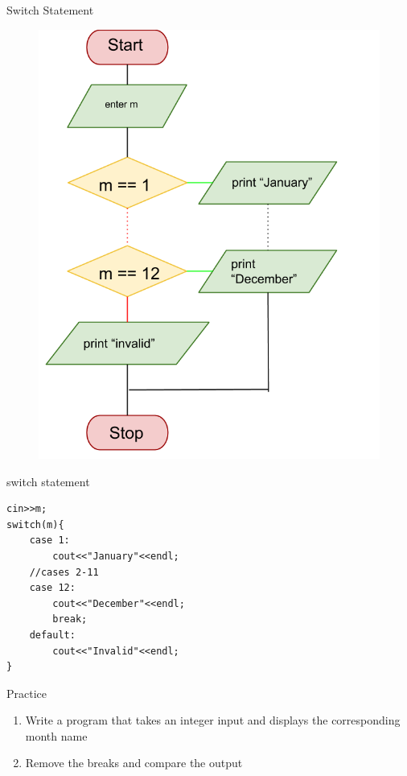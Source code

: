 \documentclass[xcolor={dvipsnames}]{beamer}
\begin{document}
\begin{frame}{Switch Statement}
\begin{center}	
	\begin{figure}
		\includegraphics[width=.6\textwidth]{switchnofall}
	\end{figure}
	\end{center}
\end{frame}

\begin{frame}[fragile]{switch statement}
\begin{verbatim}
cin>>m;
switch(m){
    case 1: 
        cout<<"January"<<endl; 
    //cases 2-11
    case 12:
        cout<<"December"<<endl;
        break;
    default:
        cout<<"Invalid"<<endl;
}
\end{verbatim}
\end{frame}

\begin{frame}{Practice}
	\begin{enumerate}
		\item Write a program that takes an integer input and displays the corresponding month name 
		\item Remove the breaks and compare the output
	\end{enumerate}
\end{frame}
\end{document}
